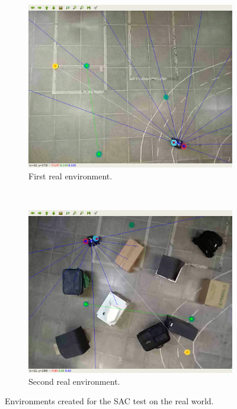 \begin{figure}[htbp]
    \centering
    \begin{subfigure}[t]{0.22\textwidth}
        \includegraphics[width=\textwidth]{images/test_env1/1.png}
        \caption{First real environment.}
        \label{subfig:real_env1}
    \end{subfigure}
    ~
    \begin{subfigure}[t]{0.22\textwidth}
        \includegraphics[width=\textwidth]{images/test_env2/1.png}
        \caption{Second real environment.}
        \label{subfig:real_env2}
    \end{subfigure}
    \caption{Environments created for the SAC test on the real world.}\label{fig:real_environments}
\end{figure}